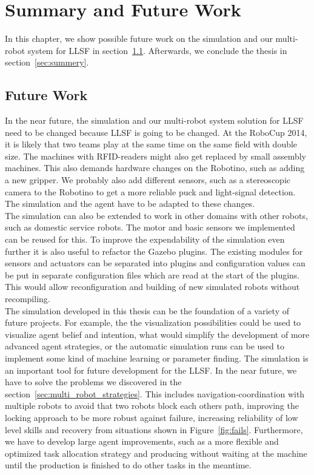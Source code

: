 \chapter{Summary and Future Work}
\label{cha:summery_and_future_work}
In this chapter, we show possible future work on the simulation and our multi-robot system for LLSF in section~\ref{sec:future_work}. Afterwards, we conclude the thesis in section~\ref{sec:summery}.

\section{Future Work}
\label{sec:future_work}
In the near future, the simulation and our multi-robot system solution for LLSF need to be changed because LLSF is going to be changed. At the RoboCup 2014, it is likely that two teams play at the same time on the same field with double size. The machines with RFID-readers might also get replaced by small assembly machines. This also demands hardware changes on the Robotino, such as adding a new gripper. We probably also add different sensors, such as a stereoscopic camera to the Robotino to get a more reliable puck and light-signal detection. The simulation and the agent have to be adapted to these changes.\\
The simulation can also be extended to work in other domains with other robots, such as domestic service robots. The motor and basic sensors we implemented can be reused for this. To improve the expendability of the simulation even further it is also useful to refactor the Gazebo plugins. The existing modules for sensors and actuators can be separated into plugins and configuration values can be put in separate configuration files which are read at the start of the plugins. This would allow reconfiguration and building of new simulated robots without recompiling.\\
The simulation developed in this thesis can be the foundation of a variety of future projects. For example, the the visualization possibilities could be used to visualize agent belief and intention, what would simplify the development of more advanced agent strategies, or the automatic simulation runs can be used to implement some kind of machine learning or parameter finding. The simulation is an important tool for future development for the LLSF. In the near future, we have to solve the problems we discovered in the section~\ref{sec:multi_robot_strategies}. This includes navigation-coordination with multiple robots to avoid that two robots block each others path, improving the locking approach to be more robust against failure, increasing reliability of low level skills and recovery from situations shown in Figure~\ref{fig:fails}. Furthermore, we have to develop large agent improvements, such as a more flexible and optimized task allocation strategy and producing without waiting at the machine until the production is finished to do other tasks in the meantime.

